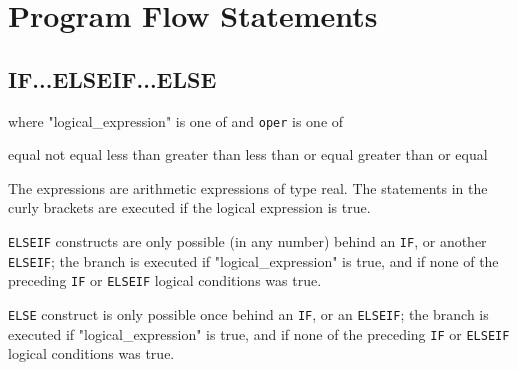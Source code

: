 
\chapter{Program Flow Statements}

 




\section{IF...ELSEIF...ELSE}
\label{sec:if}


where "logical\_expression" is one of 
and \texttt{oper} is one of 
\begin{madlist}
\ttitem{==}  equal
\ttitem{<>}  not equal
\ttitem{<}  less than
\ttitem{>}  greater than
\ttitem{<=}  less than or equal
\ttitem{>=}  greater than or equal
\end{madlist}

The expressions are arithmetic expressions of type real. The statements
in the curly brackets are executed if the logical expression is true.  

\texttt{ELSEIF} constructs are only possible (in any number) behind an
\texttt{IF}, or another \texttt{ELSEIF}; the branch is executed if
"logical\_expression" is true, and if none of the preceding \texttt{IF}
or \texttt{ELSEIF} logical conditions was true.   


\texttt{ELSE} construct is only possible once behind an \texttt{IF}, or
an \texttt{ELSEIF}; the branch is executed if "logical\_expression" is
true, and if none of the preceding \texttt{IF} or \texttt{ELSEIF}
logical conditions was true.   

